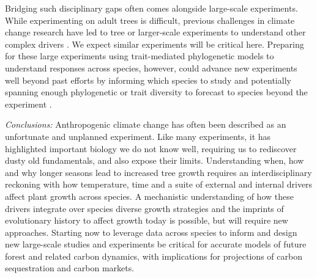 \documentclass[11pt]{article}
\begin{document}
Bridging such disciplinary gaps often comes alongside large-scale experiments. While experimenting on adult trees is difficult, previous challenges in climate change research have led to tree or larger-scale experiments to understand other complex drivers \citep[e.g. SPRUCE, DroughtNet, Pfynwald,][]{norby2011ecological,hanson2017attaining,smith2016drought}. We expect similar experiments will be critical here. Preparing for these large experiments using trait-mediated phylogenetic models to understand responses across species, however, could advance new experiments well beyond past efforts by informing which species to study and potentially spanning enough phylogenetic or trait diversity to forecast to species beyond the experiment \citep{morales2024phylogenetic}. 


\emph{Conclusions:} 
Anthropogenic climate change has often been described as an unfortunate and unplanned experiment. Like many experiments, it has highlighted important biology we do not know well, requiring us to rediscover dusty old fundamentals, and also expose their limits. Understanding when, how and why longer seasons lead to increased tree growth requires an interdisciplinary reckoning with how temperature, time and a suite of external and internal drivers affect plant growth across species. A mechanistic understanding of how these drivers integrate over species diverse growth strategies and the imprints of evolutionary history to affect growth today is possible, but will require new approaches.  Starting now to leverage data across species to inform and design new large-scale studies and experiments be critical for accurate models of future forest and related carbon dynamics, with implications for projections of carbon sequestration and carbon markets. 


\end{document}
